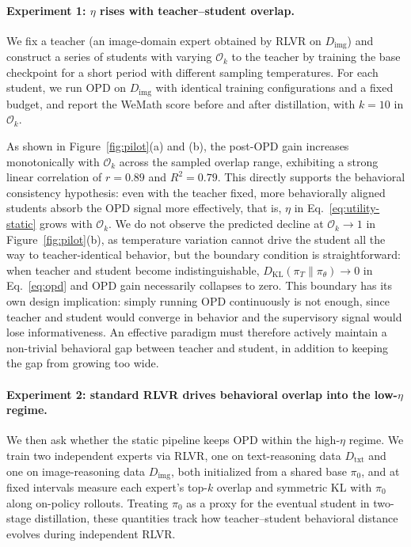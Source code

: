 \documentclass{llmxive}
\begin{document}
\paragraph{Experiment 1: \texorpdfstring{$\eta$}{...} rises with teacher--student overlap.} 
We fix a teacher (an image-domain expert obtained by RLVR on $D_{\text{img}}$) and construct a series of students with varying $\mathcal{O}_k$ to the teacher by training the base checkpoint for a short period with different sampling temperatures. For each student, we run OPD on $D_{\text{img}}$ with identical training configurations and a fixed budget, and report the WeMath score before and after distillation, with $k = 10$ in $\mathcal{O}_k$.

As shown in Figure~\ref{fig:pilot}(a) and (b), the post-OPD gain increases monotonically with $\mathcal{O}_k$ across the sampled overlap range, exhibiting a strong linear correlation of $r = 0.89$ and $R^2 = 0.79$. This directly supports the behavioral consistency hypothesis: even with the teacher fixed, more behaviorally aligned students absorb the OPD signal more effectively, that is, $\eta$ in Eq.~\eqref{eq:utility-static} grows with $\mathcal{O}_k$. We do not observe the predicted decline at $\mathcal{O}_k \to 1$ in Figure~\ref{fig:pilot}(b), as temperature variation cannot drive the student all the way to teacher-identical behavior, but the boundary condition is straightforward: when teacher and student become indistinguishable, $D_{\mathrm{KL}}(\pi_T \| \pi_\theta) \to 0$ in Eq.~\eqref{eq:opd} and OPD gain necessarily collapses to zero. This boundary has its own design implication: simply running OPD continuously is not enough, since teacher and student would converge in behavior and the supervisory signal would lose informativeness. An effective paradigm must therefore actively maintain a non-trivial behavioral gap between teacher and student, in addition to keeping the gap from growing too wide.


\paragraph{Experiment 2: standard RLVR drives behavioral overlap into the low-\texorpdfstring{$\eta$}{...} regime.}
We then ask whether the static pipeline keeps OPD within the high-$\eta$ regime. We train two independent experts via RLVR, one on text-reasoning data $D_{\text{txt}}$ and one on image-reasoning data $D_{\text{img}}$, both initialized from a shared base $\pi_0$, and at fixed intervals measure each expert's top-$k$ overlap and symmetric KL with $\pi_0$ along on-policy rollouts. Treating $\pi_0$ as a proxy for the eventual student in two-stage distillation, these quantities track how teacher--student behavioral distance evolves during independent RLVR.
\end{document}
